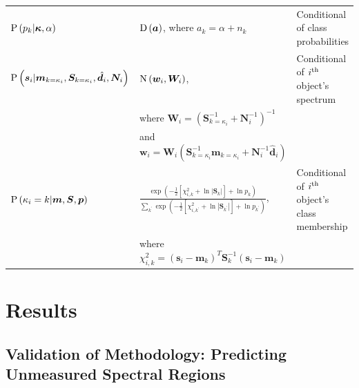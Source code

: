 \documentclass[a4paper,fleqn,usenatbib]{mnras}
\newcommand{\prob}{{\rm P}}
\newcommand{\normal}{{\rm{N}}}
\newcommand{\dirichlet}{{\rm D}}
\newcommand{\alphas}{{\bm a}}
\newcommand{\specmean}{{\bm m}}
\newcommand{\speccov}{{\bm S}}
\newcommand{\classprob}{{p}}
\newcommand{\classprobs}{{\bm p}}
\newcommand{\objspec}{{\bm s}}
\newcommand{\objclass}{{\kappa}}
\newcommand{\objclasses}{{\bm \kappa}}
\newcommand{\objdata}{\hat{\bm d}}
\newcommand{\objnoise}{{\bm N}}
\newcommand{\wfmean}{{\bm w}}
\newcommand{\wfcov}{{\bm W}}
\begin{document}
\begin{table}
\begin{tabular}{lll}
        $\prob\left(\classprob_k | \objclasses, \alpha\right)$ & $\dirichlet\left(\alphas\right)$, where $a_k = \alpha + n_k$ & Conditional of class probabilities \\
        $\prob \left( \objspec_i | \specmean_{k=\objclass_i}, \speccov_{k=\objclass_i}, \objdata_i, \objnoise_i \right)$ & $\normal \left( \wfmean_i, \wfcov_i \right)$, & Conditional of $i^{\rm th}$ object's spectrum \\
         & where $\wfcov_i = \left( \speccov_{k=\objclass_i}^{-1} + \objnoise_i^{-1} \right)^{-1}$ &  \\
         & and $\wfmean_i = \wfcov_i \left( \speccov_{k=\objclass_i}^{-1} \specmean_{k=\objclass_i} + \objnoise_i^{-1} \objdata_i \right)$ &  \\
        $\prob \left( \objclass_i = k | \specmean, \speccov, \classprobs \right)$ & $ \frac{ \exp \left( -\frac{1}{2} \left[ \chi^2_{i,k} + \ln \left| \speccov_k \right| \right] + \ln \classprob_k \right) }{ \sum_{k^\prime} \exp \left( -\frac{1}{2} \left[ \chi^2_{i,k^\prime} + \ln \left| \speccov_{k^\prime} \right| \right] + \ln \classprob_{k^\prime} \right) }$, & Conditional of $i^{\rm th}$ object's class membership \\
         & where $\chi^2_{i,k} = \left( \objspec_i - \specmean_k \right)^T \speccov_k^{-1} \left( \objspec_i - \specmean_k \right) $ &  \\
        \hline
    \end{tabular}
\end{table}



\section{Results}
\label{sec:results}

\subsection{Validation of Methodology: Predicting Unmeasured Spectral Regions}
\label{sec:validation}
\end{document}
